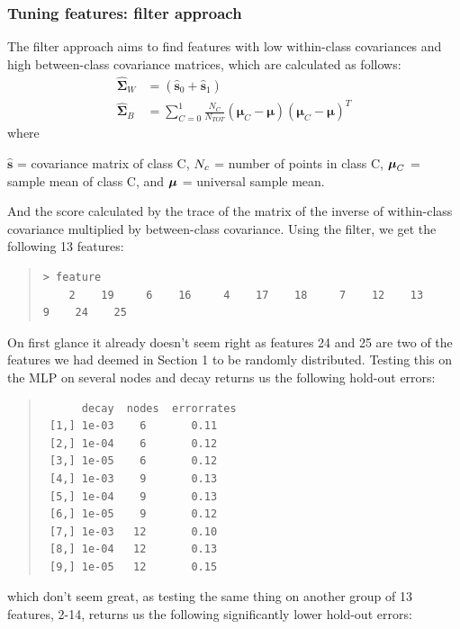 \documentclass[11pt, a4paper]{article}
\newcommand{\bSigma}{\boldsymbol{\Sigma}}
\newcommand{\bmu}{\boldsymbol{\mu}}
\begin{document}
\subsubsection{Tuning features: filter approach}
The filter approach aims to find features with low within-class covariances and high between-class covariance matrices, which are calculated as follows:
\begin{align*}
 \hat{\bSigma}_W &= (\hat{\boldsymbol{s}}_0 + \hat{\boldsymbol{s}}_1)
\\\hat{\bSigma}_B &= \sum_{C=0}^1 \frac{N_C}{N_{TOT}} (\bmu_C - \bmu)(\bmu_C-\bmu)^T
\end{align*}
where

$\hat{\boldsymbol{s}}$ = covariance matrix of class C,
$\\N_c$ = number of points in class C,
$\\\bmu_C$ = sample mean of class C, and
$\\\bmu$ = universal sample mean.

And the score calculated by the trace of the matrix of the inverse of within-class covariance multiplied by between-class covariance. Using the filter, we get the following 13 features:

\begin{quote}
\begin{verbatim}
> feature 
    2    19     6    16     4    17    18     7    12    13     9    24    25 
\end{verbatim}
\end{quote}

On first glance it already doesn't seem right as features 24 and 25 are two of the features we had deemed in Section 1 to be randomly distributed. Testing this on the MLP on several nodes and decay returns us the following hold-out errors:

\begin{quote}
\begin{verbatim}
      decay  nodes  errorrates
 [1,] 1e-03    6       0.11
 [2,] 1e-04    6       0.12
 [3,] 1e-05    6       0.12
 [4,] 1e-03    9       0.13
 [5,] 1e-04    9       0.13
 [6,] 1e-05    9       0.12
 [7,] 1e-03   12       0.10
 [8,] 1e-04   12       0.13
 [9,] 1e-05   12       0.15
\end{verbatim}
\end{quote}

which don't seem great, as testing the same thing on another group of 13 features, 2-14, returns us the following significantly lower hold-out errors:
\end{document}

